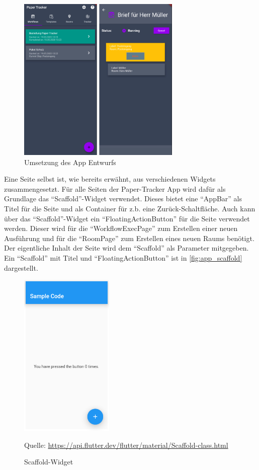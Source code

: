 \begin{figure}[htbp]
	\includegraphics[height=300px]{images/app.png}
	\centering
	\caption{Umsetzung des App Entwurfs}
	\label{fig:app_pages}
\end{figure}

Eine Seite selbst ist, wie bereits erwähnt, aus verschiedenen Widgets zusammengesetzt.
Für alle Seiten der Paper-Tracker App wird dafür als Grundlage das \enquote{Scaffold}-Widget verwendet.
Dieses bietet eine \enquote{AppBar} als Titel für die Seite und als Container für z.b. eine Zurück-Schaltfläche.
Auch kann über das \enquote{Scaffold}-Widget ein \enquote{FloatingActionButton} für die Seite verwendet werden.
Dieser wird für die \enquote{WorkflowExecPage} zum Erstellen einer neuen Ausführung und für die \enquote{RoomPage}
zum Erstellen eines neuen Raums benötigt.
Der eigentliche Inhalt der Seite wird dem \enquote{Scaffold} als Parameter mitgegeben.
Ein \enquote{Scaffold} mit Titel und \enquote{FloatingActionButton} ist in \autoref{fig:app_scaffold} dargestellt.

\begin{figure}[htbp]
	\includegraphics[height=300px]{images/scaffold.png}
	\centering
	\caption{Scaffold-Widget}
	\small Quelle: \url{https://api.flutter.dev/flutter/material/Scaffold-class.html}
	\label{fig:app_scaffold}
\end{figure}

